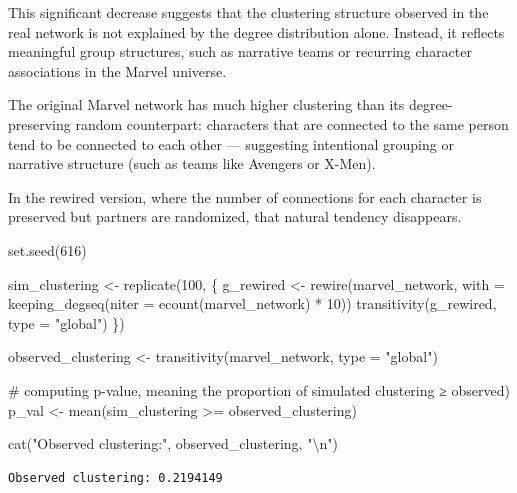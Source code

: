 \documentclass[
  letterpaper,
  DIV=11,
  numbers=noendperiod]{scrartcl}
\newenvironment{Shaded}{\begin{snugshade}}{\end{snugshade}}
\newcommand{\AttributeTok}[1]{\textcolor[rgb]{0.40,0.45,0.13}{#1}}
\newcommand{\CommentTok}[1]{\textcolor[rgb]{0.37,0.37,0.37}{#1}}
\newcommand{\DecValTok}[1]{\textcolor[rgb]{0.68,0.00,0.00}{#1}}
\newcommand{\FunctionTok}[1]{\textcolor[rgb]{0.28,0.35,0.67}{#1}}
\newcommand{\NormalTok}[1]{\textcolor[rgb]{0.00,0.23,0.31}{#1}}
\newcommand{\OtherTok}[1]{\textcolor[rgb]{0.00,0.23,0.31}{#1}}
\newcommand{\SpecialCharTok}[1]{\textcolor[rgb]{0.37,0.37,0.37}{#1}}
\newcommand{\StringTok}[1]{\textcolor[rgb]{0.13,0.47,0.30}{#1}}
\begin{document}
This significant decrease suggests that the clustering structure
observed in the real network is not explained by the degree distribution
alone. Instead, it reflects meaningful group structures, such as
narrative teams or recurring character associations in the Marvel
universe.

The original Marvel network has much higher clustering than its
degree-preserving random counterpart: characters that are connected to
the same person tend to be connected to each other --- suggesting
intentional grouping or narrative structure (such as teams like Avengers
or X-Men).

In the rewired version, where the number of connections for each
character is preserved but partners are randomized, that natural
tendency disappears.

\begin{Shaded}
\begin{Highlighting}[]
\FunctionTok{set.seed}\NormalTok{(}\DecValTok{616}\NormalTok{)}

\NormalTok{sim\_clustering }\OtherTok{\textless{}{-}} \FunctionTok{replicate}\NormalTok{(}\DecValTok{100}\NormalTok{, \{}
\NormalTok{  g\_rewired }\OtherTok{\textless{}{-}} \FunctionTok{rewire}\NormalTok{(marvel\_network,}
                      \AttributeTok{with =} \FunctionTok{keeping\_degseq}\NormalTok{(}\AttributeTok{niter =} \FunctionTok{ecount}\NormalTok{(marvel\_network) }\SpecialCharTok{*} \DecValTok{10}\NormalTok{))}
  \FunctionTok{transitivity}\NormalTok{(g\_rewired, }\AttributeTok{type =} \StringTok{"global"}\NormalTok{)}
\NormalTok{\})}

\NormalTok{observed\_clustering }\OtherTok{\textless{}{-}} \FunctionTok{transitivity}\NormalTok{(marvel\_network, }\AttributeTok{type =} \StringTok{"global"}\NormalTok{)}

\CommentTok{\# computing p{-}value, meaning the proportion of simulated clustering ≥ observed)}
\NormalTok{p\_val }\OtherTok{\textless{}{-}} \FunctionTok{mean}\NormalTok{(sim\_clustering }\SpecialCharTok{\textgreater{}=}\NormalTok{ observed\_clustering)}

\FunctionTok{cat}\NormalTok{(}\StringTok{"Observed clustering:"}\NormalTok{, observed\_clustering, }\StringTok{"}\SpecialCharTok{\textbackslash{}n}\StringTok{"}\NormalTok{)}
\end{Highlighting}
\end{Shaded}

\begin{verbatim}
Observed clustering: 0.2194149 
\end{verbatim}
\end{document}
